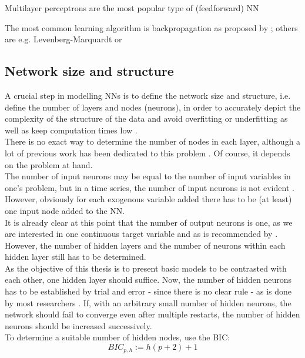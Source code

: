 \documentclass[a4paper, 11pt]{article}
\begin{document}
Multilayer perceptrons are the most popular type of (feedforward) NN \citep{Balkin.1997, Benkachcha.2015}

The most common learning algorithm is backpropagation as proposed by \cite{Rumelhart.1986}; others are e.g. Levenberg-Marquardt or 

\subsection{Network size and structure}

A crucial step in modelling NNs is to define the network size and structure, i.e. define the number of layers and nodes (neurons), in order to accurately depict the complexity of the structure of the data and avoid overfitting or underfitting as well as keep computation times low \citep{Karsoliya.2012}.\\
There is no exact way to determine the number of nodes in each layer, although a lot of previous work has been dedicated to this problem \citep{Karsoliya.2012}. Of course, it depends on the problem at hand.\\
The number of input neurons may be equal to the number of input variables in one's problem, but in a time series, the number of input neurons is not evident \citep{Zhang.1998}. However, obviously for each exogenous variable added there has to be (at least) one input node added to the NN.\\
It is already clear at this point that the number of output neurons is one, as we are interested in one continuous target variable and as is recommended by \cite{Karsoliya.2012}.\\

However, the number of hidden layers and the number of neurons within each hidden layer still has to be determined. \\
As the objective of this thesis is to present basic models to be contrasted with each other, one hidden layer should suffice. Now, the number of hidden neurons has to be established by trial and error - since there is no clear rule - as is done by most researchers \citep{Karsoliya.2012}. If, with an arbitrary small number of hidden neurons, the network should fail to converge even after multiple restarts, the number of hidden neurons should be increased successively. \\
To determine a suitable number of hidden nodes, \cite{Adhikari.2015} use the BIC:
\begin{equation}
	BIC_{p,h} := h(p+2) + 1
\end{equation}
\end{document}
